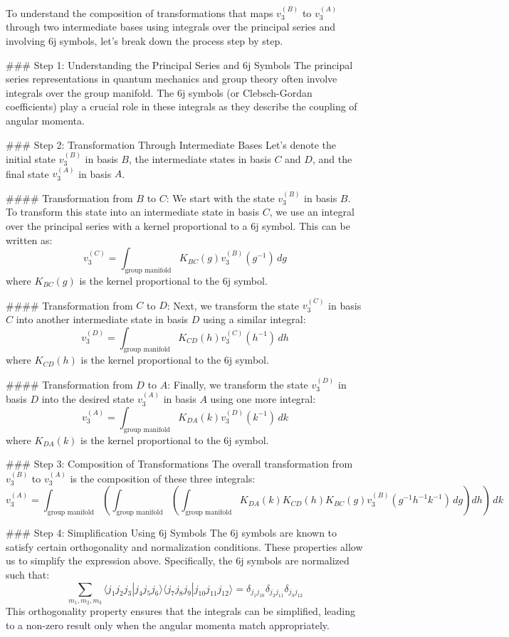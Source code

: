 To understand the composition of transformations that maps \( v_3^{(B)} \) to \( v_3^{(A)} \) through two intermediate bases using integrals over the principal series and involving 6j symbols, let's break down the process step by step.

### Step 1: Understanding the Principal Series and 6j Symbols
The principal series representations in quantum mechanics and group theory often involve integrals over the group manifold. The 6j symbols (or Clebsch-Gordan coefficients) play a crucial role in these integrals as they describe the coupling of angular momenta.

### Step 2: Transformation Through Intermediate Bases
Let's denote the initial state \( v_3^{(B)} \) in basis \( B \), the intermediate states in basis \( C \) and \( D \), and the final state \( v_3^{(A)} \) in basis \( A \).

#### Transformation from \( B \) to \( C \):
We start with the state \( v_3^{(B)} \) in basis \( B \). To transform this state into an intermediate state in basis \( C \), we use an integral over the principal series with a kernel proportional to a 6j symbol. This can be written as:
\[
v_3^{(C)} = \int_{\text{group manifold}} K_{BC}(g) v_3^{(B)}(g^{-1}) \, dg
\]
where \( K_{BC}(g) \) is the kernel proportional to the 6j symbol.

#### Transformation from \( C \) to \( D \):
Next, we transform the state \( v_3^{(C)} \) in basis \( C \) into another intermediate state in basis \( D \) using a similar integral:
\[
v_3^{(D)} = \int_{\text{group manifold}} K_{CD}(h) v_3^{(C)}(h^{-1}) \, dh
\]
where \( K_{CD}(h) \) is the kernel proportional to the 6j symbol.

#### Transformation from \( D \) to \( A \):
Finally, we transform the state \( v_3^{(D)} \) in basis \( D \) into the desired state \( v_3^{(A)} \) in basis \( A \) using one more integral:
\[
v_3^{(A)} = \int_{\text{group manifold}} K_{DA}(k) v_3^{(D)}(k^{-1}) \, dk
\]
where \( K_{DA}(k) \) is the kernel proportional to the 6j symbol.

### Step 3: Composition of Transformations
The overall transformation from \( v_3^{(B)} \) to \( v_3^{(A)} \) is the composition of these three integrals:
\[
v_3^{(A)} = \int_{\text{group manifold}} \left( \int_{\text{group manifold}} \left( \int_{\text{group manifold}} K_{DA}(k) K_{CD}(h) K_{BC}(g) v_3^{(B)}(g^{-1} h^{-1} k^{-1}) \, dg \right) dh \right) \, dk
\]

### Step 4: Simplification Using 6j Symbols
The 6j symbols are known to satisfy certain orthogonality and normalization conditions. These properties allow us to simplify the expression above. Specifically, the 6j symbols are normalized such that:
\[
\sum_{m_1, m_2, m_3} \langle j_1 j_2 j_3 | j_4 j_5 j_6 \rangle \langle j_7 j_8 j_9 | j_{10} j_{11} j_{12} \rangle = \delta_{j_1 j_{10}} \delta_{j_2 j_{11}} \delta_{j_3 j_{12}}
\]
This orthogonality property ensures that the integrals can be simplified, leading to a non-zero result only when the angular momenta match appropriately.

